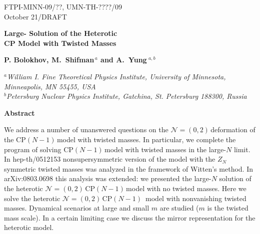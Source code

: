 \documentclass[epsfig,12pt]{article}
\newcommand{\nzt}{${\mathcal N}=(0,2)\,$}
\newcommand{\cpn}{CP$(N-1)\,$}
\begin{document}


\begin{titlepage}

\begin{flushright}
FTPI-MINN-09/??, UMN-TH-????/09\\
October 21/DRAFT
\end{flushright}

\vspace{1cm}

\begin{center}
{  \Large \bf  Large- Solution of the Heterotic\\[2mm]
 CP Model with Twisted Masses}
\end{center}



\vspace{1mm}

\begin{center}

 {\large
 \bf   P. Bolokhov,  M.~Shifman$^{\,a}$ and \bf A.~Yung$^{\,\,a,b}$}
\end {center}

\begin{center}


$^a${\it  William I. Fine Theoretical Physics Institute,
University of Minnesota,
Minneapolis, MN 55455, USA}\\
$^{b}${\it Petersburg Nuclear Physics Institute, Gatchina, St. Petersburg
188300, Russia
}
\end{center}


\begin{center}
{\large\bf Abstract}
\end{center}
We address a number of unanswered questions on the \nzt deformation of the \cpn model with
twisted masses.  In particular, we
complete the program of solving \cpn model with twisted masses in the large-$N$
limit. In hep-th/0512153 nonsupersymmetric version of the model with the $Z_N$
symmetric twisted masses was analyzed in the framework of Witten's method. In arXiv:0803.0698 
this analysis was extended: we presented the 
large-$N$ solution of the heterotic \nzt \cpn model with no twisted masses.
Here we solve the heterotic \nzt \mbox{\cpn}  model with nonvanishing twisted
masses. Dynamical scenarios at large and small $m$ are studied
($m$ is the twisted mass scale).
In a certain limiting case we discuss the mirror representation for the heterotic model.

\vspace{2cm}




\end{titlepage}
\end{document}
